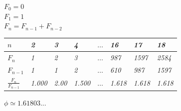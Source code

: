 \documentclass{beamer}
\theoremstyle{definition}
\begin{document}
\begin{frame}
    \begin{center}
        \color{yellow!79}\huge{$F_{0} = 0$}   \\
        \color{yellow!79}\huge{$F_{1} = 1$}    \\
        \color{yellow!79}\huge{$F_{n} = F_{n-1} + F_{n-2}$}
    \end{center}
\end{frame}


\begin{frame}
    \begin{center}
\color{yellow!79}
\begin{table}
\centering
\begin{tabular}{|l|l|l|l|l|l|l|l|}
\hline
\textbf{$n$}                     & \textit{2}     & \textit{3}    & \textit{4}     & \textit{$\dots$} & \textit{16}    & \textit{17}    & \textit{18}    \\ \hline
\textbf{$F_{n}$}                 & \textit{1}     & \textit{2}    & \textit{3}     & \textit{$\dots$} & \textit{987}   & \textit{1597}  & \textit{2584}  \\ \hline
\textbf{$F_{n-1}$}               & \textit{1}     & \textit{1}    & \textit{2}     & \textit{$\dots$} & \textit{610}   & \textit{987}   & \textit{1597}  \\ \hline
\textbf{$\frac{F_{n}}{F_{n-1}}$} & \textit{1.000} & \textit{2.00} & \textit{1.500} & \textit{$\dots$} & \textit{1.618} & \textit{1.618} & \textit{1.618} \\ \hline
\end{tabular}
\end{table}
\pause
    \vspace{3mm}
    \color{yellow!79}\huge{$\phi \simeq 1.61803...$}
    \end{center}
\end{frame}
\end{document}
